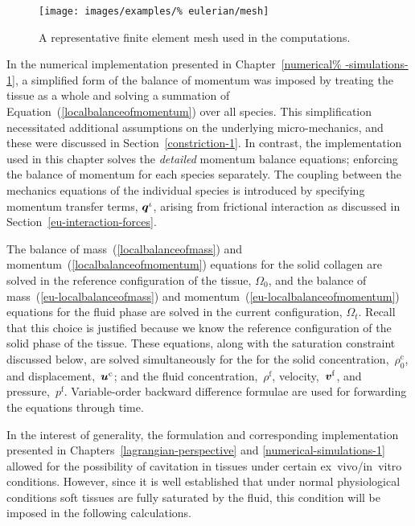 \begin{figure}[ht]
  \centering
  \texttt{[image: images/examples/\%
    eulerian/mesh]}
  \caption{A representative finite element mesh used in the
    computations.}
  \label{egmesh2d}
\end{figure}

In the numerical implementation presented in Chapter~\ref{numerical%
  -simulations-1}, a simplified form of the balance of momentum was
imposed by treating the tissue as a whole and solving a summation of
Equation~(\ref{localbalanceofmomentum}) over all species. This
simplification necessitated additional assumptions on the underlying
micro-mechanics, and these were discussed in
Section~\ref{constriction-1}. In contrast, the implementation used in
this chapter solves the {\em detailed} momentum balance equations;
enforcing the balance of momentum for each species separately. The
coupling between the mechanics equations of the individual species is
introduced by specifying momentum transfer terms, $\mbox{\boldmath$ q$}^{\iota}$,
arising from frictional interaction as discussed in
Section~\ref{eu-interaction-forces}.

The balance of mass~(\ref{localbalanceofmass}) and
momentum~(\ref{localbalanceofmomentum}) equations for the solid
collagen are solved in the reference configuration of the tissue,
$\Omega_{0}$, and the balance of mass~(\ref{eu-localbalanceofmass})
and momentum~(\ref{eu-localbalanceofmomentum}) equations for the fluid
phase are solved in the current configuration, $\Omega_{t}$. Recall
that this choice is justified because we know the reference
configuration of the solid phase of the tissue. These equations, along
with the saturation constraint discussed below, are solved
simultaneously for the for the solid
concentration,~$\rho_{0}^{\mathrm{c}}$, and
displacement,~$\mbox{\boldmath$ u$}^{\mathrm{c}}$; and the fluid
concentration,~$\rho^{\mathrm{f}}$, velocity,~$\mbox{\boldmath$ v$}^{\mathrm{f}}$, and
pressure,~$p^{\mathrm{f}}$. Variable-order backward difference
formulae \citep{leveque2007} are used for forwarding the equations
through time.

In the interest of generality, the formulation and corresponding
implementation presented in Chapters~\ref{lagrangian-perspective} and
\ref{numerical-simulations-1} allowed for the possibility of
cavitation in tissues under certain ex~vivo/in~vitro
conditions. However, since it is well established that under normal
physiological conditions soft tissues are fully saturated by the
fluid, this condition will be imposed in the following calculations.

